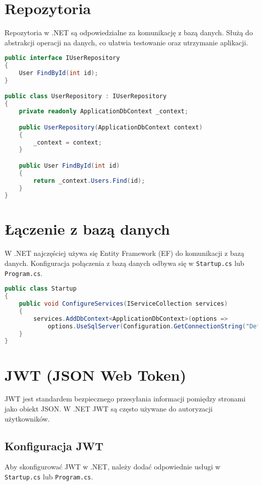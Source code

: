 \documentclass[a4paper,12pt]{article}
\begin{document}
\section{Repozytoria}
Repozytoria w .NET są odpowiedzialne za komunikację z bazą danych. Służą do abstrakcji operacji na danych, co ułatwia testowanie oraz utrzymanie aplikacji.

\begin{lstlisting}[language=C#, caption=Przykład repozytorium w .NET]
public interface IUserRepository
{
    User FindById(int id);
}

public class UserRepository : IUserRepository
{
    private readonly ApplicationDbContext _context;

    public UserRepository(ApplicationDbContext context)
    {
        _context = context;
    }

    public User FindById(int id)
    {
        return _context.Users.Find(id);
    }
}
\end{lstlisting}

\section{Łączenie z bazą danych}
W .NET najczęściej używa się Entity Framework (EF) do komunikacji z bazą danych. Konfiguracja połączenia z bazą danych odbywa się w \texttt{Startup.cs} lub \texttt{Program.cs}.

\begin{lstlisting}[language=C#, caption=Konfiguracja Entity Framework]
public class Startup
{
    public void ConfigureServices(IServiceCollection services)
    {
        services.AddDbContext<ApplicationDbContext>(options =>
            options.UseSqlServer(Configuration.GetConnectionString("DefaultConnection")));
    }
}
\end{lstlisting}

\section{JWT (JSON Web Token)}
JWT jest standardem bezpiecznego przesyłania informacji pomiędzy stronami jako obiekt JSON. W .NET JWT są często używane do autoryzacji użytkowników.

\subsection{Konfiguracja JWT}
Aby skonfigurować JWT w .NET, należy dodać odpowiednie usługi w \texttt{Startup.cs} lub \texttt{Program.cs}.
\end{document}
